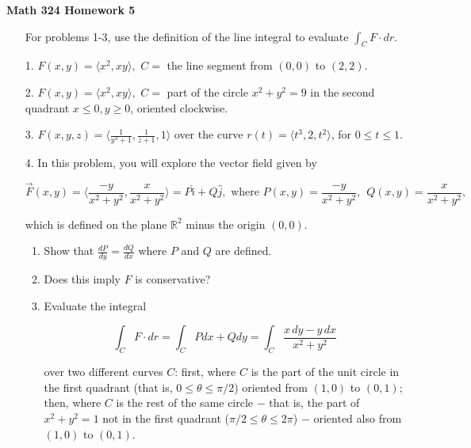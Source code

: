 \documentclass[11 pt]{report}
\begin{document}
\centerline{\bf Math 324 Homework 5}


\vspace{.2cm}

\begin{enumerate} \item[] For problems 1-3, use the definition of the line integral to evaluate $\int_C F \cdot dr$. 

\item[1.] $F(x,y) = \langle x^2, xy \rangle, $ $ C = $ the line segment from $(0,0)$ to $(2,2)$. 

\item[2.] $F(x,y) = \langle x^2, xy \rangle, $ $C = $ part of the circle $x^2 +y^2 = 9$ in the second quadrant $x \leq 0, y \geq 0$, oriented clockwise. 

\item[3.] $F(x,y,z) = \langle \frac{1}{y^3+1}, \frac{1}{z+1}, 1 \rangle$ over the curve $r(t) = \langle t^3, 2, t^2 \rangle$, for $0 \leq t \leq 1$. 

\vspace{10pt}

\item[4.] In this problem, you will explore the vector field given by 

$$\vec{F}(x,y) = \Big\langle \frac{-y}{x^2+y^2}, \frac{x}{x^2+y^2} \Big \rangle = P \hat{i} + Q \hat{j}, \text{ where } P(x,y) =  \frac{-y}{x^2+y^2}, \hspace{5pt} Q(x,y) = \frac{x}{x^2+y^2},$$

which is defined on the plane $\mathbb{R}^2$ minus the origin $(0,0)$.

\begin{enumerate} \item Show that $\displaystyle{\frac{dP}{dy} = \frac{dQ}{dx}}$ where $P$ and $Q$ are defined. 

\item Does this imply $F$ is conservative? 

\item Evaluate the integral 

$$\int_C F \cdot dr = \int_C Pdx + Qdy = \int_C \frac{x\,dy - y \,dx}{x^2+y^2}$$

over two different curves $C$: first, where $C$ is the part of the unit circle in the first quadrant (that is, $0 \leq \theta \leq \pi/2$) oriented from $(1,0)$ to $(0,1)$; then, where $C$ is the rest of the same circle $-$ that is, the part of $x^2+y^2 = 1$ not in the first quadrant ($\pi/2 \leq \theta \leq 2\pi$) $-$ oriented also from $(1,0)$ to $(0,1)$. 


\end{enumerate}
\end{enumerate}
\end{document}
